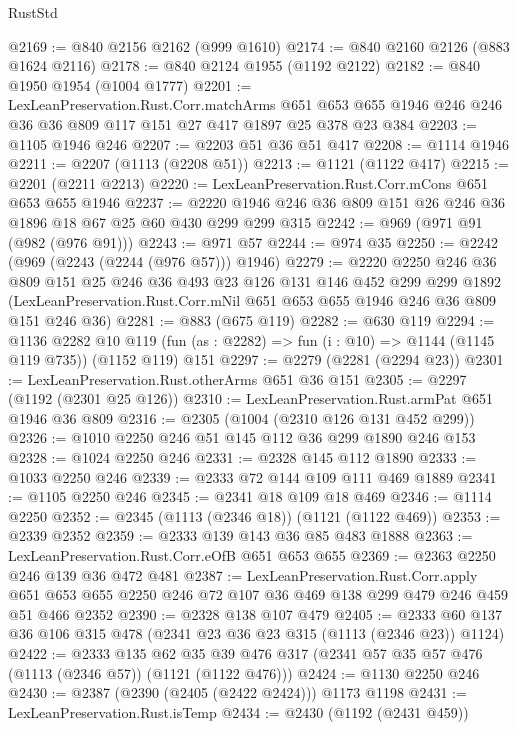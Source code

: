 \begin{lexlean}{RustStd}
\begin{coremodule}
@2169 := @840 @2156 @2162 (@999 @1610)
@2174 := @840 @2160 @2126 (@883 @1624 @2116)
@2178 := @840 @2124 @1955 (@1192 @2122)
@2182 := @840 @1950 @1954 (@1004 @1777)
@2201 := LexLeanPreservation.Rust.Corr.matchArms
    @651
    @653
    @655
    @1946
    @246
    @246
    @36
    @36
    @809
    @117
    @151
    @27
    @417
    @1897
    @25
    @378
    @23
    @384
@2203 := @1105 @1946 @246
@2207 := @2203 @51 @36 @51 @417
@2208 := @1114 @1946
@2211 := @2207 (@1113 (@2208 @51))
@2213 := @1121 (@1122 @417)
@2215 := @2201 (@2211 @2213)
@2220 := LexLeanPreservation.Rust.Corr.mCons @651 @653 @655 @1946
@2237 := @2220 @1946 @246 @36 @809 @151 @26 @246 @36 @1896 @18 @67 @25 @60 @430 @299 @299 @315
@2242 := @969 (@971 @91 (@982 (@976 @91)))
@2243 := @971 @57
@2244 := @974 @35
@2250 := @2242 (@969 (@2243 (@2244 (@976 @57))) @1946)
@2279 := @2220
    @2250
    @246
    @36
    @809
    @151
    @25
    @246
    @36
    @493
    @23
    @126
    @131
    @146
    @452
    @299
    @299
    @1892
    (LexLeanPreservation.Rust.Corr.mNil @651 @653 @655 @1946 @246 @36 @809 @151 @246 @36)
@2281 := @883 (@675 @119)
@2282 := @630 @119
@2294 := @1136
    @2282
    @10
    @119
    (fun (as : @2282) => fun (i : @10) => @1144 (@1145 @119 @735))
    (@1152 @119)
    @151
@2297 := @2279 (@2281 (@2294 @23))
@2301 := LexLeanPreservation.Rust.otherArms @651 @36 @151
@2305 := @2297 (@1192 (@2301 @25 @126))
@2310 := LexLeanPreservation.Rust.armPat @651 @1946 @36 @809
@2316 := @2305 (@1004 (@2310 @126 @131 @452 @299))
@2326 := @1010 @2250 @246 @51 @145 @112 @36 @299 @1890 @246 @153
@2328 := @1024 @2250 @246
@2331 := @2328 @145 @112 @1890
@2333 := @1033 @2250 @246
@2339 := @2333 @72 @144 @109 @111 @469 @1889
@2341 := @1105 @2250 @246
@2345 := @2341 @18 @109 @18 @469
@2346 := @1114 @2250
@2352 := @2345 (@1113 (@2346 @18)) (@1121 (@1122 @469))
@2353 := @2339 @2352
@2359 := @2333 @139 @143 @36 @85 @483 @1888
@2363 := LexLeanPreservation.Rust.Corr.eOfB @651 @653 @655
@2369 := @2363 @2250 @246 @139 @36 @472 @481
@2387 := LexLeanPreservation.Rust.Corr.apply
    @651
    @653
    @655
    @2250
    @246
    @72
    @107
    @36
    @469
    @138
    @299
    @479
    @246
    @459
    @51
    @466
    @2352
@2390 := @2328 @138 @107 @479
@2405 := @2333 @60 @137 @36 @106 @315 @478 (@2341 @23 @36 @23 @315 (@1113 (@2346 @23)) @1124)
@2422 := @2333
    @135
    @62
    @35
    @39
    @476
    @317
    (@2341 @57 @35 @57 @476 (@1113 (@2346 @57)) (@1121 (@1122 @476)))
@2424 := @1130 @2250 @246
@2430 := @2387 (@2390 (@2405 (@2422 @2424))) @1173 @1198
@2431 := LexLeanPreservation.Rust.isTemp
@2434 := @2430 (@1192 (@2431 @459))

\end{coremodule}
\end{lexlean}
